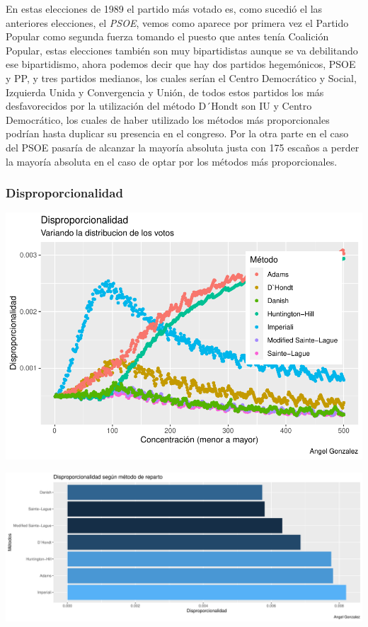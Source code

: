 \documentclass[12pt,a4paper,]{book}
\numberwithin{dummy}{section}
\theoremstyle{ocrenumbox}
\theoremstyle{blacknumex}
\theoremstyle{blacknumbox}
\theoremstyle{ocrenum}
\theoremstyle{ocrenum}
\begin{document}
En estas elecciones de 1989 el partido más votado es, como sucedió el
las anteriores elecciones, el \emph{PSOE}, vemos como aparece por
primera vez el Partido Popular como segunda fuerza tomando el puesto que
antes tenía Coalición Popular, estas elecciones también son muy
bipartidistas aunque se va debilitando ese bipartidismo, ahora podemos
decir que hay dos partidos hegemónicos, PSOE y PP, y tres partidos
medianos, los cuales serían el Centro Democrático y Social, Izquierda
Unida y Convergencia y Unión, de todos estos partidos los más
desfavorecidos por la utilización del método D´Hondt son IU y Centro
Democrático, los cuales de haber utilizado los métodos más
proporcionales podrían hasta duplicar su presencia en el congreso. Por
la otra parte en el caso del PSOE pasaría de alcanzar la mayoría
absoluta justa con 175 escaños a perder la mayoría absoluta en el caso
de optar por los métodos más proporcionales.

\hypertarget{disproporcionalidad-4}{%
\subsubsection{Disproporcionalidad}\label{disproporcionalidad-4}}

\begin{center}\includegraphics[width=0.95\linewidth]{figurasR/unnamed-chunk-48-1} \end{center}

\begin{center}\includegraphics[width=0.95\linewidth]{figurasR/unnamed-chunk-48-2} \end{center}
\end{document}
